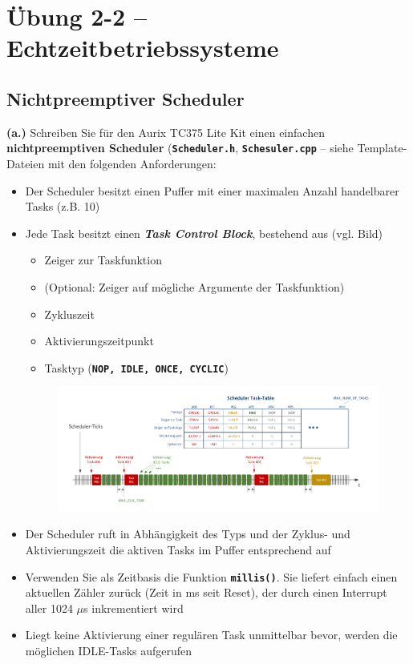 \documentclass[
    fontsize=12pt,                      %
    paper=a4,                           %
    twoside=off,                       %
    DIV=15,                             %
    BCOR=12mm,                          %
    headings=normal,                    %
    headsepline=false,                   %
    footsepline=false,                  %
    headinclude=true,                   %
    footinclude=false,                  %
    toc=listof,                         %
    toc=bib,                            %
    chapterprefix=false,                %
    appendixprefix=false,               %
    numbers=noendperiod,                %
    captions=tableabove,                %
    footnotes=multiple,                 %
    bibliography=oldstyle,              %
    draft=false,                        %
]{scrreprt}
\newcommand{\Farbcode}[1]{\texttt{\textbf{\textcolor{myred}{#1}}}}
\begin{document}
\chapter*{Übung 2-2 -- Echtzeitbetriebssysteme}

\section*{Nichtpreemptiver Scheduler}
\textbf{(a.)}
\vskip 0.2cm
\noindent
Schreiben Sie für den Aurix TC375 Lite Kit einen einfachen \textbf{nichtpreemptiven Scheduler} (\Farbcode{Scheduler.h}, \Farbcode{Schesuler.cpp} -- siehe Template-Dateien mit den folgenden Anforderungen:
\begin{itemize}
\item Der Scheduler besitzt einen Puffer mit einer maximalen Anzahl handelbarer Tasks (z.B. 10) 
\item Jede Task besitzt einen \textbf{\emph{Task Control Block}}, bestehend aus (vgl. Bild)
\begin{itemize}
\item Zeiger zur Taskfunktion
\item (Optional: Zeiger auf mögliche Argumente der Taskfunktion)
\item Zykluszeit
\item Aktivierungszeitpunkt
\item Tasktyp (\Farbcode{NOP, IDLE, ONCE, CYCLIC})
\end{itemize}

\begin{figure}[H]
	\centering
	\includegraphics[width=\textwidth]{Figures/Scheduler}
\end{figure}

\item Der Scheduler ruft in Abhängigkeit des Typs und der Zyklus- und Aktivierungszeit die aktiven Tasks im Puffer entsprechend auf  
\item Verwenden Sie als Zeitbasis die Funktion \Farbcode{millis()}. Sie liefert einfach einen aktuellen Zähler zurück (Zeit in ms seit Reset), der durch einen Interrupt aller 1024 $\mu$s inkrementiert wird
\item Liegt keine Aktivierung einer regulären Task unmittelbar bevor, werden die möglichen IDLE-Tasks aufgerufen


\end{itemize}
\end{document}
